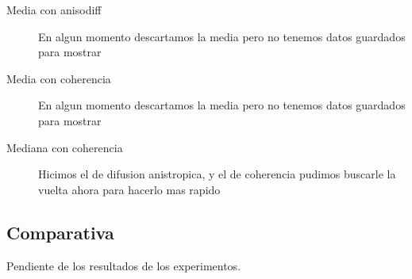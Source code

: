 

\begin{description}
  \item[Media con anisodiff] En algun momento descartamos la media pero no tenemos datos guardados para mostrar
  \item[Media con coherencia] En algun momento descartamos la media pero no tenemos datos guardados para mostrar
  \item[Mediana con coherencia] Hicimos el de difusion anistropica, y el de coherencia pudimos buscarle la vuelta ahora para hacerlo mas rapido
\end{description}

\subsection{Comparativa}

Pendiente de los resultados de los experimentos.












